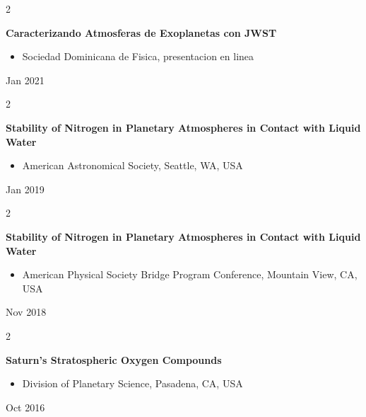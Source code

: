 \documentclass[10pt, letterpaper]{article}
\newenvironment{highlights}{
    \begin{itemize}[
        topsep=0.10 cm,
        parsep=0.10 cm,
        partopsep=0pt,
        itemsep=0pt,
        leftmargin=0.4 cm + 10pt
    ]
}{
    \end{itemize}
} %
\newenvironment{twocolentry}[2][]{
    \onecolentry
    \def\secondColumn{#2}
    \setcolumnwidth{\fill, 4.5 cm}
    \begin{paracol}{2}
}{
    \switchcolumn \raggedleft \secondColumn
    \end{paracol}
    \endonecolentry
} %
\begin{document}
        \vspace{0.2 cm}

        \begin{twocolentry}{
            Jan 2021
        }
            \textbf{Caracterizando Atmosferas de Exoplanetas con JWST}
            \begin{highlights}
                \item Sociedad Dominicana de Fisica, presentacion en linea
            \end{highlights}
        \end{twocolentry}


        \vspace{0.2 cm}

        \begin{twocolentry}{
            Jan 2019
        }
            \textbf{Stability of Nitrogen in Planetary Atmospheres in Contact with Liquid Water}
            \begin{highlights}
                \item American Astronomical Society, Seattle, WA, USA
            \end{highlights}
        \end{twocolentry}


        \vspace{0.2 cm}

        \begin{twocolentry}{
            Nov 2018
        }
            \textbf{Stability of Nitrogen in Planetary Atmospheres in Contact with Liquid Water}
            \begin{highlights}
                \item American Physical Society Bridge Program Conference, Mountain View, CA, USA
            \end{highlights}
        \end{twocolentry}


        \vspace{0.2 cm}

        \begin{twocolentry}{
            Oct 2016
        }
            \textbf{Saturn's Stratospheric Oxygen Compounds}
            \begin{highlights}
                \item Division of Planetary Science, Pasadena, CA, USA
            \end{highlights}
        \end{twocolentry}
\end{document}
